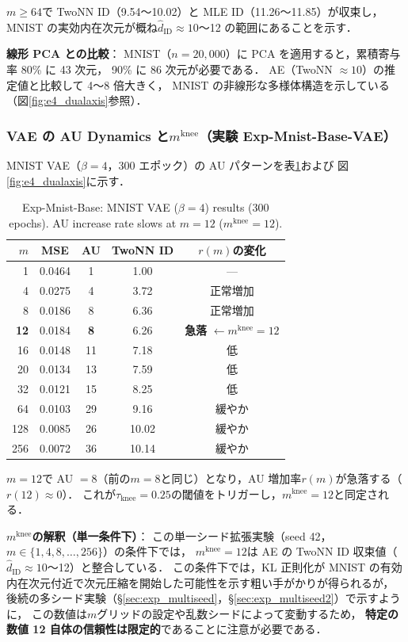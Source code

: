 \documentclass[11pt,a4paper]{jsarticle}
\newcommand{\mknee}{m^{\mathrm{knee}}}
\begin{document}
$m \geq 64$で TwoNN ID（9.54〜10.02）と MLE ID（11.26〜11.85）が収束し，
MNIST の実効内在次元が概ね$\hat{d}_\mathrm{ID} \approx 10$〜12 の範囲にあることを示す．

\textbf{線形 PCA との比較}：
MNIST（$n = 20{,}000$）に PCA を適用すると，累積寄与率 80\% に 43 次元，
90\% に 86 次元が必要である．
AE（TwoNN $\approx 10$）の推定値と比較して 4〜8 倍大きく，
MNIST の非線形な多様体構造を示している（図\ref{fig:e4_dualaxis}参照）．

\subsubsection{VAE の AU Dynamics と$\mknee$（実験 Exp-Mnist-Base-VAE）}

MNIST VAE（$\beta = 4$，300 エポック）の AU パターンを表\ref{tab:e4_vae}および
図\ref{fig:e4_dualaxis}に示す．

\begin{table}[H]
\centering
\caption{Exp-Mnist-Base: MNIST VAE ($\beta=4$) results (300 epochs). AU increase rate slows at $m=12$ ($\mknee=12$).}
\label{tab:e4_vae}
\small
\begin{tabular}{rcccc}
\toprule
$m$ & MSE & AU & TwoNN ID & $r(m)$の変化 \\
\midrule
1   & 0.0464 & 1  & 1.00 & --- \\
4   & 0.0275 & 4  & 3.72 & 正常増加 \\
8   & 0.0186 & 8  & 6.36 & 正常増加 \\
\textbf{12} & 0.0184 & \textbf{8}  & 6.26 & \textbf{急落} $\leftarrow \mknee = 12$ \\
16  & 0.0148 & 11 & 7.18 & 低 \\
20  & 0.0134 & 13 & 7.59 & 低 \\
32  & 0.0121 & 15 & 8.25 & 低 \\
64  & 0.0103 & 29 & 9.16 & 緩やか \\
128 & 0.0085 & 26 & 10.02 & 緩やか \\
256 & 0.0072 & 36 & 10.14 & 緩やか \\
\bottomrule
\end{tabular}
\end{table}

$m = 12$で AU $= 8$（前の$m = 8$と同じ）となり，AU 増加率$r(m)$が急落する（$r(12) \approx 0$）．
これが$\tau_{\mathrm{knee}} = 0.25$の閾値をトリガーし，$\mknee = 12$と同定される．

\textbf{$\mknee$の解釈（単一条件下）}：
この単一シード拡張実験（seed 42，$m \in \{1,4,8,\ldots,256\}$）の条件下では，
$\mknee = 12$は AE の TwoNN ID 収束値（$\hat{d}_\mathrm{ID} \approx 10$〜12）と整合している．
この条件下では，KL 正則化が MNIST の有効内在次元付近で次元圧縮を開始した可能性を示す粗い手がかりが得られるが，
後続の多シード実験（§\ref{sec:exp_multiseed}，§\ref{sec:exp_multiseed2}）で示すように，
この数値は$m$グリッドの設定や乱数シードによって変動するため，
\textbf{特定の数値 12 自体の信頼性は限定的}であることに注意が必要である．
\end{document}
